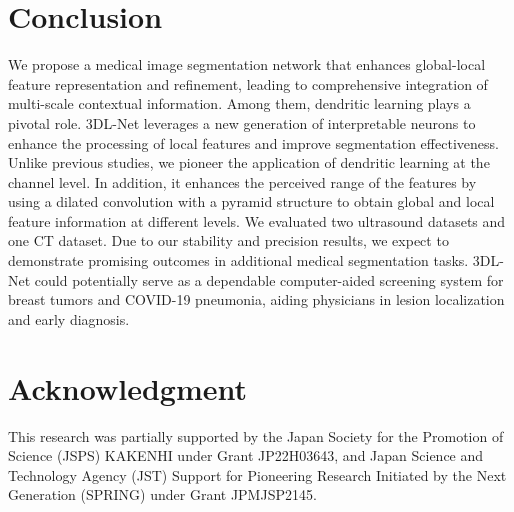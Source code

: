 \documentclass[review]{elsarticle}
\begin{document}
	\section{Conclusion}
	\label{section:conclusion}
	We propose a medical image segmentation network that enhances global-local feature representation and refinement, leading to comprehensive integration of multi-scale contextual information. Among them, dendritic learning plays a pivotal role. 3DL-Net leverages a new generation of interpretable neurons to enhance the processing of local features and improve segmentation effectiveness. Unlike previous studies, we pioneer the application of dendritic learning at the channel level. In addition, it enhances the perceived range of the features by using a dilated convolution with a pyramid structure to obtain global and local feature information at different levels. We evaluated two ultrasound datasets and one CT dataset. Due to our stability and precision results, we expect to demonstrate promising outcomes in additional medical segmentation tasks. 3DL-Net could potentially serve as a dependable computer-aided screening system for breast tumors and COVID-19 pneumonia, aiding physicians in lesion localization and early diagnosis.
	\section*{Acknowledgment}
	This research was partially supported by the Japan Society for the Promotion of Science (JSPS) KAKENHI under Grant JP22H03643, and Japan Science and Technology Agency (JST) Support for Pioneering Research Initiated by the Next Generation (SPRING) under Grant JPMJSP2145.
	

\end{document}
